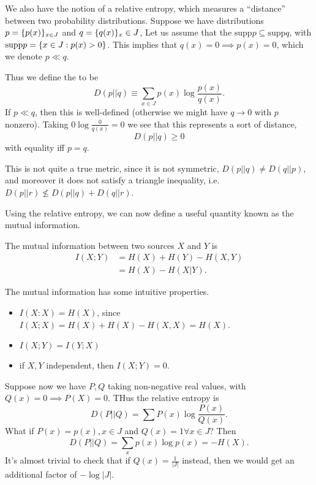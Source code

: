 We also have the notion of a relative entropy, which measures a ``distance'' between two probability distributions. Suppose we have distributions $p=\{p(x)\}_{x\in J}$ and $q=\{q(x)\}_x\in J$, Let us assume that the $\text{supp}p \subseteq \text{supp} q$, with $\text{supp} p = \{x\in J: p(x) >0\}$. This implies that $q(x)=0\implies p(x)=0$, which we denote $p\ll q$.
\begin{defn}
    Thus we define the  to be
    \begin{equation}
        D(p||q)  \equiv \sum_{x\in J} p(x) \log \frac{p(x)}{q(x)}.
    \end{equation}
    If $p\ll q$, then this is well-defined (otherwise we might have $q\to 0$ with $p$ nonzero). Taking $0\log \frac{0}{q(x)}=0$ we see that this represents a sort of distance,
    \begin{equation}
        D(p||q) \geq 0
    \end{equation}
    with equality iff $p=q$.
\end{defn}
This is not quite a true metric, since it is not symmetric, $D(p||q)\neq D(q||p)$, and moreover it does not satisfy a triangle inequality, i.e. $D(p||r)\not\leq D(p||q) +D(q||r)$.

Using the relative entropy, we can now define a useful quantity known as the mutual information.
\begin{defn}
    The mutual information between two sources $X$ and $Y$ is
    \begin{align*}
        I(X;Y) &= H(X)+ H(Y) - H(X,Y)\\
        &= H(X)- H(X|Y).
    \end{align*}
\end{defn}
The mutual information has some intuitive properties.
\begin{itemize}
    \item $I(X:X)=H(X)$, since $I(X;X)=H(X)+H(X)-H(X,X)= H(X)$.
    \item $I(X;Y) = I(Y;X)$
    \item if $X,Y$ independent, then $I(X;Y)=0$.
\end{itemize}

Suppose now we have $P,Q$ taking non-negative real values, with $Q(x)=0 \implies P(X)=0$. THus the relative entropy is
\begin{equation*}
    D(P||Q)=\sum P(x) \log \frac{P(x)}{Q(x)}.
\end{equation*}
What if $P(x)=p(x), x\in J$ and $Q(x)=1 \forall x \in J$? Then
\begin{equation}
    D(P||Q)=\sum_x p(x) \log p(x) = -H(X).
\end{equation}
It's almost trivial to check that if $Q(x)=\frac{1}{|J|}$ instead, then we would get an additional factor of $-\log |J|.$

